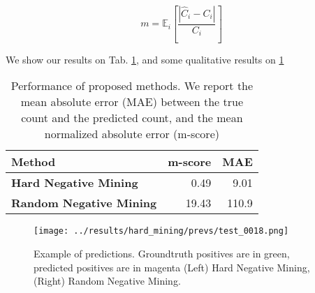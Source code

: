 \documentclass[11pt]{article}
\begin{document}
\[
m = \mathbb{E}_i \left[ \frac{|\hat{C}_i - C_i|}{C_i} \right]
\]

We show our results on Tab. \ref{tab:orge1e5479}, and some qualitative results on \ref{fig:org6cffaa3}

\begin{table}[htbp]
\centering
\begin{tabular}{lrr}
Method & m-score & MAE\\
\hline
\textbf{Hard Negative Mining} & 0.49 & 9.01\\
\textbf{Random Negative Mining} & 19.43 & 110.9\\
\end{tabular}
\caption{\label{tab:orge1e5479}Performance of proposed methods. We report the mean absolute error (MAE) between the true count and the predicted count, and the mean normalized absolute error (m-score)}

\end{table}

\begin{figure}[htbp]
\centering
\texttt{[image: ../results/hard\_mining/prevs/test\_0018.png]}
\caption{\label{fig:org6cffaa3}Example of predictions. Groundtruth positives are in green, predicted positives are in magenta (Left) Hard Negative Mining, (Right) Random Negative Mining.}
\end{figure}
\end{document}
